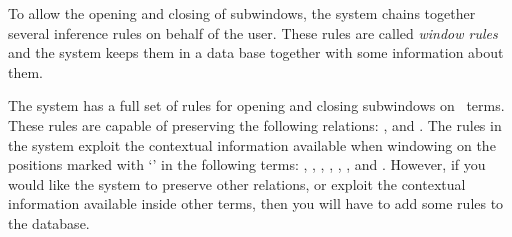 To allow the opening and closing of subwindows,
the system chains together several inference rules on behalf of the user.
These rules are called {\it window rules\/} and the system keeps them
in a data base together with some information about them.

The system has a full set of rules for opening and closing
subwindows on \HOL\ terms.
These rules are capable of preserving the following relations:
,  and .
The rules in the system exploit the contextual
information available when windowing on the positions 
marked with `\ml{\_}' in the following
terms: , , , ,
, , and .
However, if you would like the system to preserve other relations,
or exploit the contextual information available inside other terms,
then you will have to add some rules to the database.

